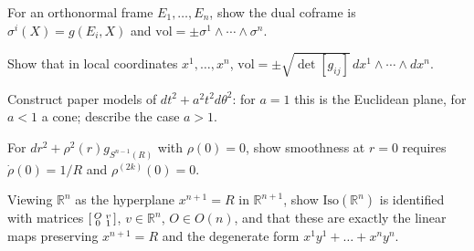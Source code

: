 \begin{remark}
  \label{rem:pet-ch1-ex-5}
  \leanok
  For an orthonormal frame $E_1,\dots,E_n$, show the dual coframe is
  $\sigma^i(X)=g(E_i,X)$ and $\mathrm{vol}=\pm\sigma^1\wedge\cdots\wedge\sigma^n$.
\end{remark}

\begin{remark}
  \label{rem:pet-ch1-ex-6}
  \leanok
  Show that in local coordinates $x^1,\dots,x^n$,
  $\mathrm{vol}=\pm\sqrt{\det[g_{ij}]}\,dx^1\wedge\cdots\wedge dx^n$.
\end{remark}

\begin{remark}
  \label{rem:pet-ch1-ex-7}
  \leanok
  Construct paper models of $dt^2+a^2t^2d\theta^2$: for $a=1$ this is the
  Euclidean plane, for $a<1$ a cone; describe the case $a>1$.
\end{remark}

\begin{remark}
  \label{rem:pet-ch1-ex-8}
  \leanok
  For $dr^2+\rho^2(r)g_{S^{n-1}(R)}$ with $\rho(0)=0$, show smoothness at $r=0$
  requires $\dot\rho(0)=1/R$ and $\rho^{(2k)}(0)=0$.
\end{remark}

\begin{remark}
  \label{rem:pet-ch1-ex-9}
  \leanok
  Viewing $\mathbb{R}^n$ as the hyperplane $x^{n+1}=R$ in $\mathbb{R}^{n+1}$, show
  $\mathrm{Iso}(\mathbb{R}^n)$ is identified with matrices
  $\begin{bsmallmatrix}O&v\\0&1\end{bsmallmatrix}$, $v\in\mathbb{R}^n$, $O\in O(n)$, and
  that these are exactly the linear maps preserving $x^{n+1}=R$ and the
  degenerate form $x^1y^1+\dots+x^ny^n$.
\end{remark}

